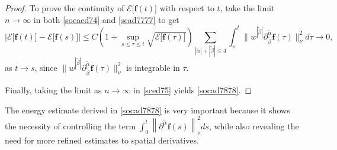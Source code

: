 \documentclass[reqno]{amsart}
\numberwithin{equation}{section}
\numberwithin{equation}{section}
\begin{document}
\begin{proof}
		To prove the continuity of 
		 $\mathcal{E}\big[\mathbf{f}(t)\big]$ with respect to $t$, take the limit  $n \to \infty$ in both \eqref{socaed74} and \eqref{scad7777} to get
		\[
		\Big|\mathcal{E}\big[\mathbf{f}(t)\big] - \mathcal{E}\big[\mathbf{f}(s)\big]\Big| \le C\left(1 + \sup_{s \le \tau \le t} \sqrt{\mathcal{E}\big[\mathbf{f}(\tau)\big]}\right) \sum_{|\tilde{\alpha}| + |\tilde{\beta}| \leq 4}\int_{s}^{t} \big\| w^{|\tilde{\beta}|} \partial_{\tilde{\beta}}^{\tilde{\alpha}} \mathbf{f}(\tau) \big\|_{\nu}^2 d\tau \to 0,
		\]
		as $t \to s$, since $\big\| w^{|\tilde{\beta}|} \partial_{\tilde{\beta}}^{\tilde{\alpha}} \mathbf{f}(\tau) \big\|^2_{\nu}$ is integrable in $\tau$. 
		
		Finally, taking the limit as $n \to \infty$ in \eqref{sced75} yields \eqref{socad7878}.
		\end{proof}
		The energy estimate derived in \eqref{socad7878} is very important because it shows the necessity of controlling the term $\int_{0}^{t} \left\| \partial^{\tilde{\alpha}} \mathbf{f}(s) \right\|_{\nu}^{2} ds$, while also revealing the need for more refined estimates to spatial derivatives.
\end{document}
